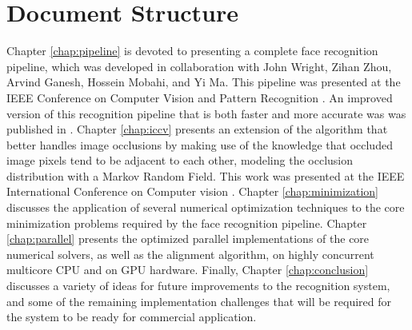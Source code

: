 \section{Document Structure}
%
Chapter \ref{chap:pipeline} is devoted to presenting a complete face
recognition pipeline, which was developed in collaboration with John Wright,
Zihan Zhou, Arvind Ganesh, Hossein Mobahi, and Yi Ma.  This pipeline was
presented at the IEEE Conference on Computer Vision and Pattern Recognition
\cite{WagnerA2009-CVPR}.  An improved version of this recognition pipeline that
is both faster and more accurate was was published in \cite{WagnerA2011-PAMI}.
%
Chapter \ref{chap:iccv} presents an extension of the algorithm that better
handles image occlusions by making use of the knowledge that occluded image
pixels tend to be adjacent to each other, modeling the occlusion distribution
with a Markov Random Field.  This work was presented at the IEEE International
Conference on Computer vision \cite{ZhouZ2009}.
%
Chapter \ref{chap:minimization} discusses the application of several numerical
optimization techniques to the core minimization problems required by the face
recognition pipeline.
%
Chapter \ref{chap:parallel} presents the optimized parallel implementations of
the core numerical solvers, as well as the alignment algorithm, on highly
concurrent multicore CPU and on GPU hardware.
%
Finally, Chapter \ref{chap:conclusion} discusses a variety of ideas for future
improvements to the recognition system, and some of the remaining
implementation challenges that will be required for the system to be ready for
commercial application.
 
